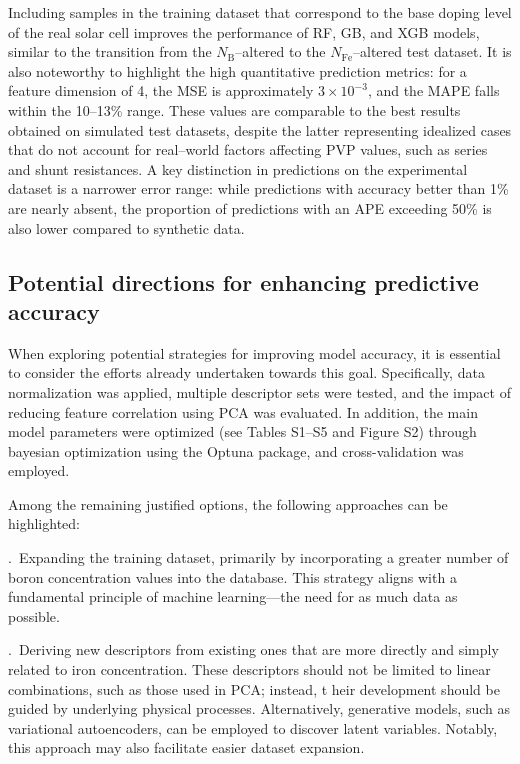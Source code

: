 \documentclass[a4paper,fleqn]{cas-sc}
\begin{document}
Including samples in the training dataset that correspond to the base doping level of the real solar cell
improves the performance of RF, GB, and XGB models,
similar to the transition from the $N_\mathrm{B}$--altered to the $N_\mathrm{Fe}$--altered test dataset.
It is also noteworthy to highlight the high quantitative prediction metrics:
for a feature dimension of 4, the MSE is approximately  $3\times10^{-3}$, and the MAPE falls within the 10--13\% range.
These values are comparable to the best results obtained on simulated test datasets,
despite the latter representing idealized cases that do not account for real--world factors affecting PVP values,
such as series and shunt resistances.
A key distinction in predictions on the experimental dataset is a narrower error range:
while predictions with accuracy better than 1\% are nearly absent,
the proportion of predictions with an APE exceeding 50\% is also lower compared to synthetic data.



\subsection{Potential directions for enhancing predictive accuracy}



When exploring potential strategies for improving model accuracy,
it is essential to consider the efforts already undertaken towards this goal.
Specifically, data normalization was applied,
multiple descriptor sets were tested, and the impact of reducing feature correlation using PCA was evaluated.
In addition, the main model parameters were optimized (see Tables S1–S5 and Figure S2)
through bayesian optimization using the Optuna package, and cross-validation was employed.

Among the remaining justified options, the following approaches can be highlighted:


.~Expanding the training dataset, primarily by incorporating a greater number of boron concentration values into the database.
This strategy aligns with a fundamental principle of machine learning—the need for as much data as possible.

.~Deriving new descriptors from existing ones that are more directly and simply related to iron concentration.
These descriptors should not be limited to linear combinations, such as those used in PCA; instead, t
heir development should be guided by underlying physical processes.
Alternatively, generative models, such as variational autoencoders,
can be employed to discover latent variables.
Notably, this approach may also facilitate easier dataset expansion.
\end{document}
